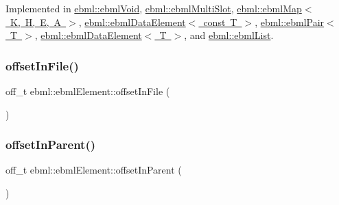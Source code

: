 Implemented in \mbox{\hyperlink{classebml_1_1ebmlVoid_ad9baeb00b771d3ae4cdebb2078f863ad}{ebml\+::ebml\+Void}}, \mbox{\hyperlink{classebml_1_1ebmlMultiSlot_a3a2407406cd68f27d974cc18223c86c0}{ebml\+::ebml\+Multi\+Slot}}, \mbox{\hyperlink{classebml_1_1ebmlMap_a44366a7b060c58b3fbe4e65c31481efc}{ebml\+::ebml\+Map$<$ K, H, E, A $>$}}, \mbox{\hyperlink{classebml_1_1ebmlDataElement_3_01const_01T_01_4_aa5a82c4528609bf788caf8db8927fbc1}{ebml\+::ebml\+Data\+Element$<$ const T $>$}}, \mbox{\hyperlink{classebml_1_1ebmlPair_a88a68eed87260a46f40371f14279da4e}{ebml\+::ebml\+Pair$<$ T $>$}}, \mbox{\hyperlink{classebml_1_1ebmlDataElement_a721eb3bfcb545510f2cebad65776f1bd}{ebml\+::ebml\+Data\+Element$<$ T $>$}}, and \mbox{\hyperlink{classebml_1_1ebmlList_a49cf343c62058b121e7c546e8afa0947}{ebml\+::ebml\+List}}.

\mbox{\label{classebml_1_1ebmlElement_abcb13644652965ed7cfcd1c023569b1c}} 
\subsubsection{\texorpdfstring{offset\+In\+File()}{offsetInFile()}}
{\footnotesize\ttfamily off\+\_\+t ebml\+::ebml\+Element\+::offset\+In\+File (\begin{DoxyParamCaption}{ }\end{DoxyParamCaption})}

\mbox{\label{classebml_1_1ebmlElement_a06ea720b5bd804288a8d36a36cf6b6a7}} 
\subsubsection{\texorpdfstring{offset\+In\+Parent()}{offsetInParent()}}
{\footnotesize\ttfamily off\+\_\+t ebml\+::ebml\+Element\+::offset\+In\+Parent (\begin{DoxyParamCaption}{ }\end{DoxyParamCaption})}

\mbox{\label{classebml_1_1ebmlElement_aa6e265beb13dae353d75cdacc77748e1}} 
